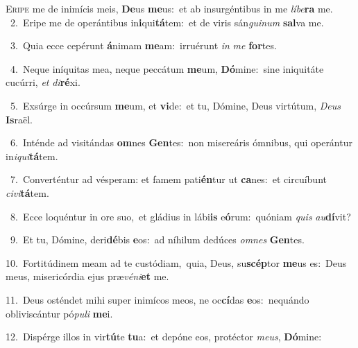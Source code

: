 \lettrine{\initial\textcolor{\initialcolor}{E}}{ripe} me de inimícis meis, \textbf{De}\-us \textbf{me}\-us:~\star et ab insurgéntibus in me \textit{lí}\-\textit{be}\textbf{ra} me.\\
{\numbfont\textcolor{\numbcolor}{~2.}}~Eripe me de operántibus in\-\textbf{i}\-qui\-\textbf{tá}\-tem:~\star et de viris sán\-\textit{gui}\-\textit{num} \textbf{sal}\-va me.\par
{\numbfont\textcolor{\numbcolor}{~3.}}~Quia ecce cepérunt \textbf{á}\-nimam \textbf{me}\-am:~\star irruérunt \textit{in} \textit{me} \textbf{for}\-tes.\par
{\numbfont\textcolor{\numbcolor}{~4.}}~Neque iníquitas mea, neque peccátum \textbf{me}\-um, \textbf{Dó}\-mine:~\star sine iniquitáte cucúrri, \textit{et} \textit{di}\-\textbf{ré}xi.\par
{\numbfont\textcolor{\numbcolor}{~5.}}~Exsúrge in occúrsum \textbf{me}\-um, et \textbf{vi}\-de:~\star et tu, Dómine, Deus virtútum, \textit{De}\-\textit{us} \textbf{Is}\-raël.\par
{\numbfont\textcolor{\numbcolor}{~6.}}~Inténde ad visitándas \textbf{om}\-nes \textbf{Gen}\-tes:~\star non misereáris ómnibus, qui operántur in\-\textit{i}\-\textit{qui}\textbf{tá}tem.\par
{\numbfont\textcolor{\numbcolor}{~7.}}~Converténtur ad vésperam: et famem pati\-\textbf{én}\-tur ut \textbf{ca}\-nes:~\star et circuíbunt \textit{ci}\-\textit{vi}\textbf{tá}tem.\par
{\numbfont\textcolor{\numbcolor}{~8.}}~Ecce loquéntur in ore suo,~\dagger et gládius in lábi\textbf{is} e\-\textbf{ó}\-rum:~\star quóniam \textit{quis} \textit{au}\-\textbf{dí}vit?\par
{\numbfont\textcolor{\numbcolor}{~9.}}~Et tu, Dómine, deri\-\textbf{dé}\-bis \textbf{e}\-os:~\star ad níhilum dedúces \textit{om}\-\textit{nes} \textbf{Gen}\-tes.\par
{\numbfont\textcolor{\numbcolor}{10.}}~Fortitúdinem meam ad te custódiam,~\dagger quia, Deus, su\-\textbf{scép}\-tor \textbf{me}\-us es:~\star Deus meus, misericórdia ejus præ\-\textit{vé}\-\textit{ni}\textbf{et} me.\par
{\numbfont\textcolor{\numbcolor}{11.}}~Deus osténdet mihi super inimícos meos, ne oc\-\textbf{cí}\-das \textbf{e}\-os:~\star nequándo obliviscántur pó\-\textit{pu}\-\textit{li} \textbf{me}\-i.\par
{\numbfont\textcolor{\numbcolor}{12.}}~Dispérge illos in vir\-\textbf{tú}\-te \textbf{tu}\-a:~\star et depóne eos, protéctor \textit{me}\-\textit{us}, \textbf{Dó}\-mine:\par
